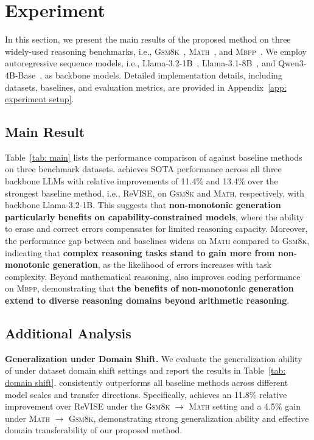 



\section{Experiment}

In this section, we present the main results of the proposed method \modelname on three widely-used reasoning benchmarks, i.e., \textsc{Gsm8k}~\citep{cobbe2021gsm8k}, \textsc{Math}~\citep{hendrycks2021measuring}, and \textsc{Mbpp}~\citep{austin2021program}.
We employ autoregressive sequence models, i.e., Llama-3.2-1B~\cite{meta2024llama}, Llama-3.1-8B~\cite{grattafiori2024llama}, and Qwen3-4B-Base~\cite{yang2025qwen3}, as backbone models.
Detailed implementation details, including datasets, baselines, and evaluation metrics, are provided in Appendix~\ref{app: experiment setup}.

\subsection{Main Result}

Table~\ref{tab: main} lists the performance comparison of \modelname against baseline methods on three benchmark datasets.
\modelname achieves SOTA performance across all three backbone LLMs with relative improvements of 11.4\% and 13.4\% over the strongest baseline method, i.e., ReVISE, on \textsc{Gsm8k} and \textsc{Math}, respectively, with backbone Llama-3.2-1B.
This suggests that \textbf{non-monotonic generation particularly benefits on capability-constrained models}, where the ability to erase and correct errors compensates for limited reasoning capacity.
Moreover, the performance gap between \modelname and baselines widens on \textsc{Math} compared to \textsc{Gsm8k}, indicating that \textbf{complex reasoning tasks stand to gain more from non-monotonic generation}, as the likelihood of errors increases with task complexity.
Beyond mathematical reasoning, \modelname also improves coding performance on \textsc{Mbpp}, demonstrating that \textbf{the benefits of non-monotonic generation extend to diverse reasoning domains beyond arithmetic reasoning}.

\subsection{Additional Analysis}

\textbf{Generalization under Domain Shift.}
We evaluate the generalization ability of \modelname under dataset domain shift settings and report the results in Table~\ref{tab: domain shift}.
\modelname consistently outperforms all baseline methods across different model scales and transfer directions.
Specifically, \modelname achieves an 11.8\% relative improvement over ReVISE under the \textsc{Gsm8k} $\rightarrow$ \textsc{Math} setting and a 4.5\% gain under \textsc{Math} $\rightarrow$ \textsc{Gsm8k}, demonstrating strong generalization ability and effective domain transferability of our proposed method.

